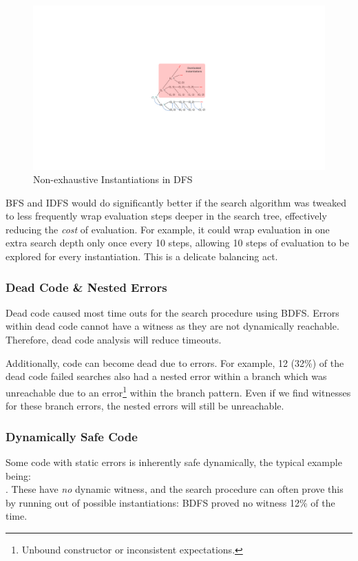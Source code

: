 \begin{figure}[H]
\centering
\includegraphics[width=1.25\textwidth, trim={15cm 10cm 10cm 10cm},clip]{Media/Figures/DFS}
\caption{Non-exhaustive Instantiations in DFS}
\label{fig:DFS}
\end{figure}
BFS and IDFS would do significantly better if the search algorithm was tweaked to less frequently wrap evaluation steps deeper in the search tree, effectively reducing the \textit{cost} of evaluation. For example, it could wrap evaluation in one extra search depth only once every 10 steps, allowing 10 steps of evaluation to be explored for every instantiation. This is a delicate balancing act.

\subsubsection{Dead Code \& Nested Errors}

Dead code caused most time outs for the search procedure using BDFS. Errors within dead code cannot have a witness as they are not dynamically reachable. Therefore, dead code analysis will reduce timeouts.

Additionally, code can become dead due to errors. For example, 12 (32\%) of the dead code failed searches also had a nested error within a branch which was unreachable due to an error\footnote{Unbound constructor or inconsistent expectations.} within the branch pattern. Even if we find witnesses for these branch errors, the nested errors will still be unreachable.


\subsubsection{Dynamically Safe Code}
Some code with static errors is inherently safe dynamically, the typical example being:\\ . These have \textit{no} dynamic witness, and the search procedure can often prove this by running out of possible instantiations: BDFS proved no witness 12\% of the time. 

